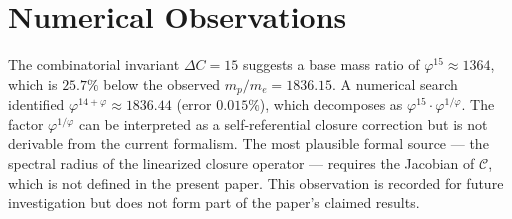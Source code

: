 \documentclass[12pt]{article}
\newcommand{\Ccal}{\mathcal{C}}
\newcommand{\phig}{\varphi}
\begin{document}
\appendix
\section{Numerical Observations}\label{app:numerics}

The combinatorial invariant $\Delta C = 15$ suggests a base mass ratio of $\phig^{15} \approx 1364$, which is $25.7\%$ below the observed $m_p/m_e = 1836.15$. A numerical search identified $\phig^{14+\phig} \approx 1836.44$ (error $0.015\%$), which decomposes as $\phig^{15} \cdot \phig^{1/\phig}$. The factor $\phig^{1/\phig}$ can be interpreted as a self-referential closure correction but is not derivable from the current formalism. The most plausible formal source --- the spectral radius of the linearized closure operator --- requires the Jacobian of $\Ccal$, which is not defined in the present paper. This observation is recorded for future investigation but does not form part of the paper's claimed results.



\end{document}
